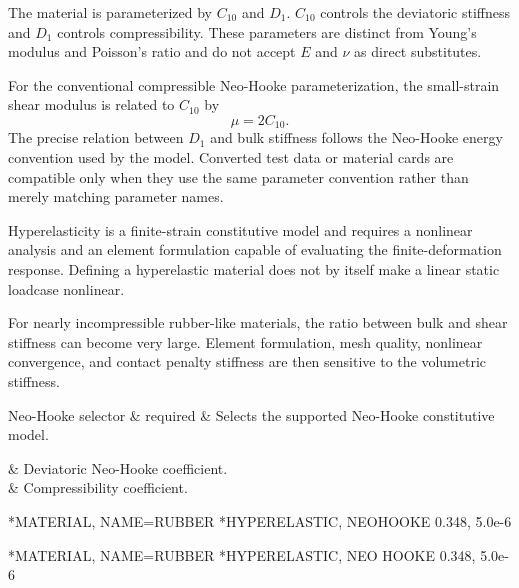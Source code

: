The material is parameterized by \(C_{10}\) and \(D_1\). \(C_{10}\) controls the deviatoric stiffness and \(D_1\) controls compressibility. These parameters are distinct from Young's modulus and Poisson's ratio and do not accept \(E\) and \(\nu\) as direct substitutes.

For the conventional compressible Neo-Hooke parameterization, the small-strain shear modulus is related to \(C_{10}\) by
\[
\mu=2C_{10}.
\]
The precise relation between \(D_1\) and bulk stiffness follows the Neo-Hooke energy convention used by the model. Converted test data or material cards are compatible only when they use the same parameter convention rather than merely matching parameter names.

Hyperelasticity is a finite-strain constitutive model and requires a nonlinear analysis and an element formulation capable of evaluating the finite-deformation response. Defining a hyperelastic material does not by itself make a linear static loadcase nonlinear.

For nearly incompressible rubber-like materials, the ratio between bulk and shear stiffness can become very large. Element formulation, mesh quality, nonlinear convergence, and contact penalty stiffness are then sensitive to the volumetric stiffness.

\begin{keywordparameters}
Neo-Hooke selector & required & Selects the supported Neo-Hooke constitutive model. \\
\end{keywordparameters}

\begin{keyworddata}
 & Deviatoric Neo-Hooke coefficient. \\
 & Compressibility coefficient. \\
\end{keyworddata}

\exampleheading

\begin{dialectexamples}
\begin{femasterdeck}
*MATERIAL, NAME=RUBBER
*HYPERELASTIC, NEOHOOKE
0.348, 5.0e-6
\end{femasterdeck}
\begin{abaqusdeck}
*MATERIAL, NAME=RUBBER
*HYPERELASTIC, NEO HOOKE
0.348, 5.0e-6
\end{abaqusdeck}
\end{dialectexamples}


